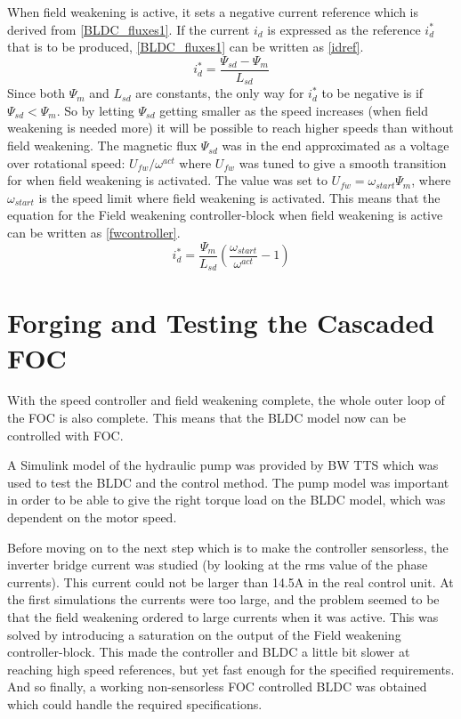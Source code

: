 \documentclass{LTHthesis}
\begin{document}
When field weakening is active, it sets a negative current reference which is derived from \eqref{BLDC_fluxes1}. If the current $i_d$ is expressed as the reference $i_d^*$ that is to be produced, \eqref{BLDC_fluxes1} can be written as \eqref{idref}.
\begin{equation} \label{idref}
i_d^*=\frac{\Psi_{sd}-\Psi_m}{L_{sd}}
\end{equation}
Since both $\Psi_m$ and $L_{sd}$ are constants, the only way for $i_d^*$ to be negative is if $\Psi_{sd}<\Psi_m$. So by letting $\Psi_{sd}$ getting smaller as the speed increases (when field weakening is needed more) it will be possible to reach higher speeds than without field weakening. The magnetic flux $\Psi_{sd}$ was in the end approximated as a voltage over rotational speed: $U_{fw}/\omega^{act}$ where $U_{fw}$ was tuned to give a smooth transition for when field weakening is activated. The value was set to $U_{fw}=\omega_{start}\Psi_m$, where $\omega_{start}$ is the speed limit where field weakening is activated. This means that the equation for the Field weakening controller-block when field weakening is active can be written as \eqref{fwcontroller}.
\begin{equation} \label{fwcontroller}
i_d^*=\frac{\Psi_m}{L_{sd}}(\frac{\omega_{start}}{\omega^{act}}-1)
\end{equation}

\section{Forging and Testing the Cascaded FOC}
With the speed controller and field weakening complete, the whole outer loop of the FOC is also complete. This means that the BLDC model now can be controlled with FOC.

A Simulink model of the hydraulic pump was provided by BW TTS which was used to test the BLDC and the control method. The pump model was important in order to be able to give the right torque load on the BLDC model, which was dependent on the motor speed.

Before moving on to the next step which is to make the controller sensorless, the inverter bridge current was studied (by looking at the rms value of the phase currents). This current could not be larger than 14.5A in the real control unit. At the first simulations the currents were too large, and the problem seemed to be that the field weakening ordered to large currents when it was active. This was solved by introducing a saturation on the output of the Field weakening controller-block. This made the controller and BLDC a little bit slower at reaching high speed references, but yet fast enough for the specified requirements. And so finally, a working non-sensorless FOC controlled BLDC was obtained which could handle the required specifications.
\end{document}
